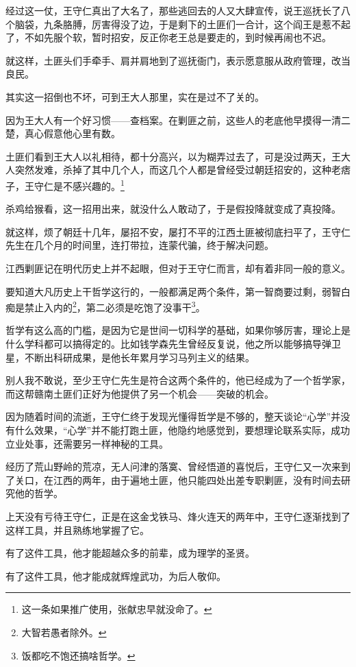 \begin{multicols}{\theparacolNo}
		经过这一仗，王守仁真出了大名了，那些逃回去的人又大肆宣传，说王巡抚长了八个脑袋，九条胳膊，厉害得没了边，于是剩下的土匪们一合计，这个阎王是惹不起了，不如先服个软，暂时招安，反正你老王总是要走的，到时候再闹也不迟。

		就这样，土匪头们手牵手、肩并肩地到了巡抚衙门，表示愿意服从政府管理，改当良民。

		其实这一招倒也不坏，可到王大人那里，实在是过不了关的。

		因为王大人有一个好习惯——查档案。在剿匪之前，这些人的老底他早摸得一清二楚，真心假意他心里有数。

		土匪们看到王大人以礼相待，都十分高兴，以为糊弄过去了，可是没过两天，王大人突然发难，杀掉了其中几个人，而这几个人都是曾经受过朝廷招安的，这种老痞子，王守仁是不感兴趣的。\footnote{这一条如果推广使用，张献忠早就没命了。}

		杀鸡给猴看，这一招用出来，就没什么人敢动了，于是假投降就变成了真投降。

		就这样，烦了朝廷十几年，屡招不安，屡打不平的江西土匪被彻底扫平了，王守仁先生在几个月的时间里，连打带拉，连蒙代骗，终于解决问题。

		江西剿匪记在明代历史上并不起眼，但对于王守仁而言，却有着非同一般的意义。

		要知道大凡历史上干哲学这行的，一般都满足两个条件，第一智商要过剩，弱智白痴是禁止入内的\footnote{大智若愚者除外。}，第二必须是吃饱了没事干\footnote{饭都吃不饱还搞啥哲学。}。

		哲学有这么高的门槛，是因为它是世间一切科学的基础，如果你够厉害，理论上是什么学科都可以搞得定的。比如钱学森先生曾经反复说，他之所以能够搞导弹卫星，不断出科研成果，是他长年累月学习马列主义的结果。

		别人我不敢说，至少王守仁先生是符合这两个条件的，他已经成为了一个哲学家，而这帮赣南土匪们正好为他提供了另一个机会——突破的机会。

		因为随着时间的流逝，王守仁终于发现光懂得哲学是不够的，整天谈论“心学”并没有什么效果，“心学”并不能打跑土匪，他隐约地感觉到，要想理论联系实际，成功立业处事，还需要另一样神秘的工具。

		经历了荒山野岭的荒凉，无人问津的落寞、曾经悟道的喜悦后，王守仁又一次来到了关口，在江西的两年，由于遍地土匪，他只能四处出差专职剿匪，没有时间去研究他的哲学。

		上天没有亏待王守仁，正是在这金戈铁马、烽火连天的两年中，王守仁逐渐找到了这样工具，并且熟练地掌握了它。

		有了这件工具，他才能超越众多的前辈，成为理学的圣贤。

		有了这件工具，他才能成就辉煌武功，为后人敬仰。


\end{multicols}
